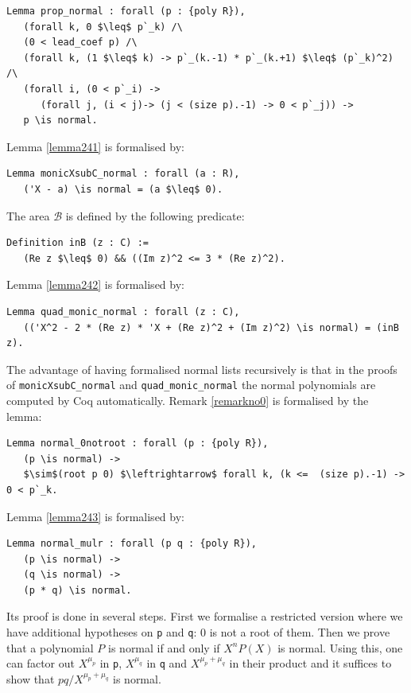 \documentclass[11pt, a4paper]{article}
\newcommand{\ssb}{{\mathcal B}}
\begin{document}
\begin{lstlisting}
Lemma prop_normal : forall (p : {poly R}),
   (forall k, 0 $\leq$ p`_k) /\
   (0 < lead_coef p) /\
   (forall k, (1 $\leq$ k) -> p`_(k.-1) * p`_(k.+1) $\leq$ (p`_k)^2) /\
   (forall i, (0 < p`_i) ->
      (forall j, (i < j)-> (j < (size p).-1) -> 0 < p`_j)) ->
   p \is normal.
\end{lstlisting}
Lemma \ref{lemma241} is formalised by:
\begin{lstlisting}
Lemma monicXsubC_normal : forall (a : R),
   ('X - a) \is normal = (a $\leq$ 0).
\end{lstlisting}
The area $\ssb$ is defined by the following predicate:
\begin{lstlisting}
Definition inB (z : C) :=
   (Re z $\leq$ 0) && ((Im z)^2 <= 3 * (Re z)^2).
\end{lstlisting}
Lemma \ref{lemma242} is formalised by:
\begin{lstlisting}
Lemma quad_monic_normal : forall (z : C),
   (('X^2 - 2 * (Re z) * 'X + (Re z)^2 + (Im z)^2) \is normal) = (inB z).
\end{lstlisting}
The advantage of having formalised normal lists recursively is that in the proofs of \lstinline!monicXsubC_normal! and \lstinline!quad_monic_normal! the normal polynomials are computed by Coq automatically. 
Remark \ref{remarkno0} is formalised by the lemma:
\begin{lstlisting}
Lemma normal_0notroot : forall (p : {poly R}),
   (p \is normal) ->
   $\sim$(root p 0) $\leftrightarrow$ forall k, (k <=  (size p).-1) -> 0 < p`_k.
\end{lstlisting}
Lemma \ref{lemma243} is formalised by:
\begin{lstlisting}
Lemma normal_mulr : forall (p q : {poly R}),
   (p \is normal) ->
   (q \is normal) ->
   (p * q) \is normal.
\end{lstlisting}
Its proof is done in several steps. First we formalise a restricted version where we have additional hypotheses on \lstinline!p! and \lstinline!q!: 0 is not a root of them. Then we prove that a polynomial $P$ is normal if and only if $X^n P(X)$ is normal. Using this, one can factor out $X^{\mu_p}$ in \lstinline!p!, $X^{\mu_q}$ in \lstinline!q! and $X^{\mu_p + \mu_q}$ in their product and it suffices to show that  $pq / X^{\mu_p + \mu_q}$ is normal.
\end{document}
